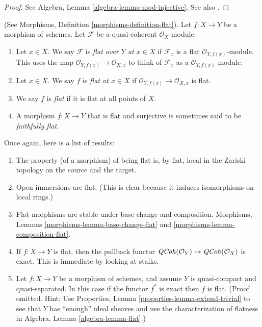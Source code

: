 \begin{proof}
See Algebra, Lemma \ref{algebra-lemma-mod-injective}.
See also \cite[Section 20]{MatCA}.
\end{proof}

\begin{definition}
\label{definition-flat-schemes}
(See Morphisms, Definition \ref{morphisms-definition-flat}).
Let $f : X \to Y$ be a morphism of schemes.
Let $\mathcal{F}$ be a quasi-coherent $\mathcal{O}_X$-module.
\begin{enumerate}
\item Let $x \in X$. We say $\mathcal{F}$ is
{\it flat over $Y$ at $x \in X$} if $\mathcal{F}_x$
is a flat $\mathcal{O}_{Y, f(x)}$-module.
This uses the map $\mathcal{O}_{Y, f(x)} \to \mathcal{O}_{X, x}$ to
think of $\mathcal{F}_x$ as a $\mathcal{O}_{Y, f(x)}$-module.
\item Let $x \in X$. We say $f$ is {\it flat at $x \in X$}
if $\mathcal{O}_{Y, f(x)} \to \mathcal{O}_{X, x}$ is flat.
\item We say $f$ is {\it flat} if it is flat at all points of $X$.
\item A morphism $f : X \to Y$ that is flat and surjective is sometimes
said to be {\it faithfully flat}.
\end{enumerate}
\end{definition}

\noindent
Once again, here is a list of results:
\begin{enumerate}
\item The property (of a morphism) of being flat is, by fiat,
local in the Zariski topology on the source and the target.
\item Open immersions are flat. (This is clear because it induces isomorphisms
on local rings.)
\item Flat morphisms are stable under base change and composition.
Morphisms, Lemmas \ref{morphisms-lemma-base-change-flat} and
\ref{morphisms-lemma-composition-flat}.
\item If $f : X \to Y$ is flat, then the pullback functor
$\mathit{QCoh}(\mathcal{O}_Y) \to \mathit{QCoh}(\mathcal{O}_X)$ is exact.
This is immediate by looking at stalks.
\item Let $f : X \to Y$ be a morphism of schemes, and assume $Y$
is quasi-compact and quasi-separated. In this case
if the functor $f^*$ is exact then $f$ is flat.
(Proof omitted. Hint: Use
Properties, Lemma \ref{properties-lemma-extend-trivial} to see that
$Y$ has ``enough'' ideal sheaves and use the characterization of
flatness in Algebra, Lemma \ref{algebra-lemma-flat}.)
\end{enumerate}



